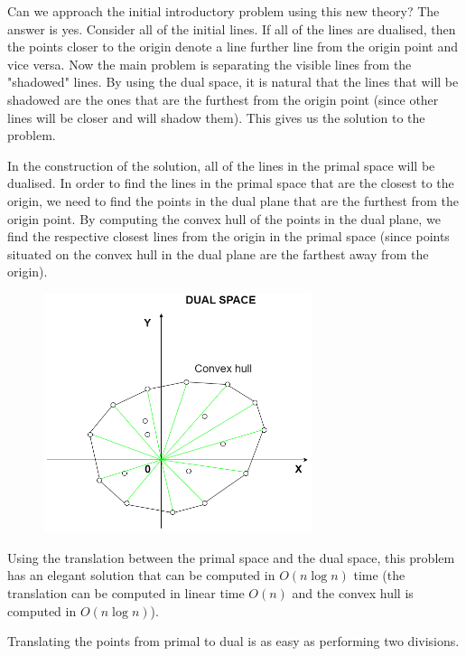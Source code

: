 \documentclass[letterpaper]{article}
\begin{document}
Can we approach the initial introductory problem using this new theory? The answer is yes. Consider all of the initial lines. If all of the lines are dualised, then the points closer to the origin denote a line further line from the origin point and vice versa. Now the main problem is separating the visible lines from the "shadowed" lines. By using the dual space, it is natural that the lines that will be shadowed are the ones that are the furthest from the origin point (since other lines will be closer and will shadow them). This gives us the solution to the problem. 

In the construction of the solution, all of the lines in the primal space will be dualised. In order to find the lines in the primal space that are the closest to the origin, we need to find the points in the dual plane that are the furthest from the origin point. By computing the convex hull of the points in the dual plane, we find the respective closest lines from the origin in the primal space (since points situated on the convex hull in the dual plane are the farthest away from the origin).


\begin{figure} [h!]
\centering
\includegraphics[width=0.7\textwidth]{pngOfDiagrams/dual4.png}
\end{figure}

Using the translation between the primal space and the dual space, this problem has an elegant solution that can be computed in $O(n \log n)$ time (the translation can be computed in linear time $O(n)$ and the convex hull is computed in $O(n \log n)$).

Translating the points from primal to dual is as easy as performing two divisions.
\end{document}
